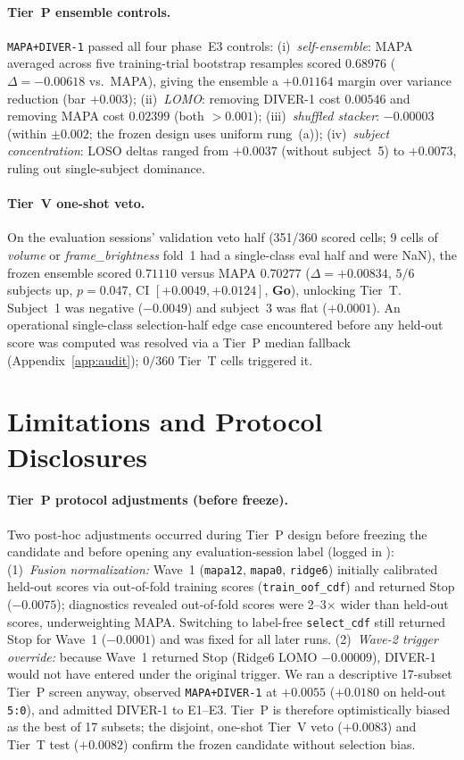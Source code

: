 \documentclass[11pt]{article}
\begin{document}
\paragraph{Tier~P ensemble controls.}
\texttt{MAPA+DIVER-1} passed all four phase~E3 controls:
(i)~\emph{self-ensemble}: MAPA averaged across five training-trial bootstrap resamples scored $0.68976$ ($\Delta=-0.00618$ vs.\ MAPA), giving the ensemble a $+0.01164$ margin over variance reduction (bar $+0.003$);
(ii)~\emph{LOMO}: removing DIVER-1 cost $0.00546$ and removing MAPA cost $0.02399$ (both $>0.001$);
(iii)~\emph{shuffled stacker}: $-0.00003$ (within $\pm 0.002$; the frozen design uses uniform rung~(a));
(iv)~\emph{subject concentration}: LOSO deltas ranged from $+0.0037$ (without subject~5) to $+0.0073$, ruling out single-subject dominance.

\paragraph{Tier~V one-shot veto.}
On the evaluation sessions' validation veto half (351/360 scored cells; 9 cells of \emph{volume} or \emph{frame\_brightness} fold~1 had a single-class eval half and were NaN), the frozen ensemble scored $0.71110$ versus MAPA $0.70277$ ($\Delta=+0.00834$, $5/6$ subjects up, $p=0.047$, CI $[+0.0049,+0.0124]$, \textbf{Go}), unlocking Tier~T. Subject~1 was negative ($-0.0049$) and subject~3 was flat ($+0.0001$). An operational single-class selection-half edge case encountered before any held-out score was computed was resolved via a Tier~P median fallback (Appendix~\ref{app:audit}); $0/360$ Tier~T cells triggered it.

\section{Limitations and Protocol Disclosures}\label{sec:disclosures}

\paragraph{Tier~P protocol adjustments (before freeze).}
Two post-hoc adjustments occurred during Tier~P design before freezing the candidate and before opening any evaluation-session label (logged in ):
(1)~\emph{Fusion normalization:} Wave~1 (\texttt{mapa12}, \texttt{mapa0}, \texttt{ridge6}) initially calibrated held-out scores via out-of-fold training scores (\texttt{train\_oof\_cdf}) and returned Stop ($-0.0075$); diagnostics revealed out-of-fold scores were 2--3$\times$ wider than held-out scores, underweighting MAPA. Switching to label-free \texttt{select\_cdf} still returned Stop for Wave~1 ($-0.0001$) and was fixed for all later runs.
(2)~\emph{Wave-2 trigger override:} because Wave~1 returned Stop (Ridge6 LOMO $-0.00009$), DIVER-1 would not have entered under the original trigger. We ran a descriptive 17-subset Tier~P screen anyway, observed \texttt{MAPA+DIVER-1} at $+0.0055$ ($+0.0180$ on held-out \texttt{5:0}), and admitted DIVER-1 to E1--E3. Tier~P is therefore optimistically biased as the best of 17 subsets; the disjoint, one-shot Tier~V veto ($+0.0083$) and Tier~T test ($+0.0082$) confirm the frozen candidate without selection bias.
\end{document}
